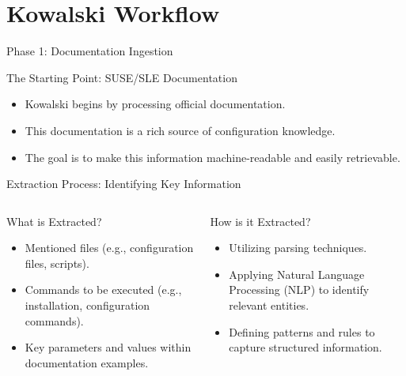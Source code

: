 \documentclass[aspectratio=169]{beamer}
\begin{document}
\section{Kowalski Workflow}
\begin{frame}{Phase 1: Documentation Ingestion}
  \begin{block}{The Starting Point: SUSE/SLE Documentation}
    \begin{itemize}
      \item Kowalski begins by processing official documentation.
      \item This documentation is a rich source of configuration knowledge.
      \item The goal is to make this information machine-readable and easily retrievable.
    \end{itemize}
  \end{block}
\end{frame}

\begin{frame}{Extraction Process: Identifying Key Information}
  \begin{columns}
    \begin{block}{What is Extracted?}
      \begin{itemize}
        \item Mentioned files (e.g., configuration files, scripts).
        \item Commands to be executed (e.g., installation, configuration commands).
        \item Key parameters and values within documentation examples.
      \end{itemize}
    \end{block}
    \begin{block}{How is it Extracted?}
      \begin{itemize}
        \item Utilizing parsing techniques.
        \item Applying Natural Language Processing (NLP) to identify relevant entities.
        \item Defining patterns and rules to capture structured information.
      \end{itemize}
    \end{block}
  \end{columns}
\end{frame}
\end{document}
